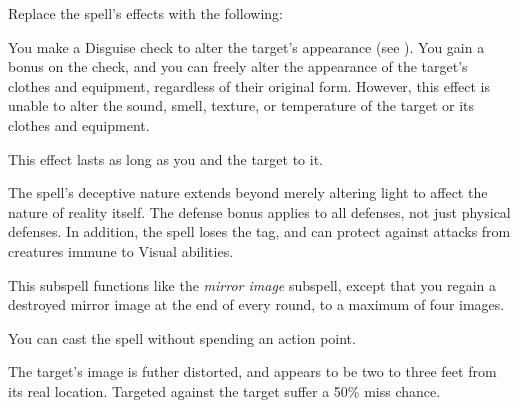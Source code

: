 


Replace the spell's effects with the following:
\begin{spellcontent}

\begin{augmenteffects}



\spelleffect
You make a Disguise check to alter the target's appearance (see ).
You gain a  bonus on the check, and you can freely alter the appearance of the target's clothes and equipment, regardless of their original form.
However, this effect is unable to alter the sound, smell, texture, or temperature of the target or its clothes and equipment.

This effect lasts as long as you and the target  to it.








\end{augmenteffects}

\end{spellcontent}






The spell's deceptive nature extends beyond merely altering light to affect the nature of reality itself.
The defense bonus applies to all defenses, not just physical defenses.
In addition, the spell loses the  tag, and can protect against attacks from creatures immune to Visual abilities.







This subspell functions like the \textit{mirror image} subspell, except that you regain a destroyed mirror image at the end of every round, to a maximum of four images.






You can cast the spell without spending an action point.






The target's image is futher distorted, and appears to be two to three feet from its real location.
Targeted  against the target suffer a 50\% miss chance.





